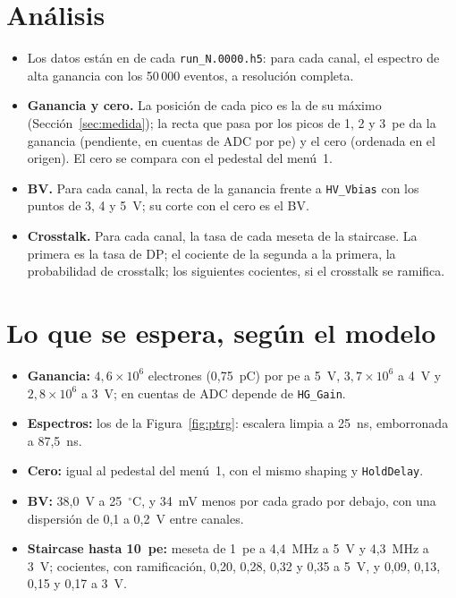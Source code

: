 \documentclass[11pt,a4paper]{article}
\begin{document}
\section{Análisis}
\label{sec:datos}

\begin{itemize}
\item {} Los datos están en
   de cada \texttt{run\_N.0000.h5}:
  para cada canal, el espectro de alta ganancia con los 50\,000 eventos, a
  resolución completa.
\item {\bf Ganancia y cero.} La posición de cada pico es la de su máximo
  (Sección~\ref{sec:medida}); la recta que pasa por los picos de 1, 2 y
  3~pe da la ganancia (pendiente, en cuentas de ADC por pe) y el cero
  (ordenada en el origen). El cero se compara con el pedestal del menú~1.
\item {\bf BV.} Para cada canal, la recta de la ganancia frente a
  \texttt{HV\_Vbias} con los puntos de 3, 4 y 5~V; su corte con el cero es
  el BV.
\item {\bf Crosstalk.} Para cada canal, la tasa de cada meseta de la
  staircase. La primera es la tasa de DP; el cociente de la segunda a la
  primera, la probabilidad de crosstalk; los siguientes cocientes, si el
  crosstalk se ramifica.
\end{itemize}

\section{Lo que se espera, según el modelo}

\begin{itemize}
\item {\bf Ganancia:} $4{,}6\times10^6$ electrones (0,75~pC) por pe a 5~V,
  $3{,}7\times10^6$ a 4~V y $2{,}8\times10^6$ a 3~V; en cuentas de ADC
  depende de \texttt{HG\_Gain}.
\item {\bf Espectros:} los de la Figura~\ref{fig:ptrg}: escalera limpia a
  25~ns, emborronada a 87,5~ns.
\item {\bf Cero:} igual al pedestal del menú~1, con el mismo shaping y
  \texttt{HoldDelay}.
\item {\bf BV:} 38,0~V a 25~$^\circ$C, y 34~mV menos por cada grado por
  debajo, con una dispersión de 0,1 a 0,2~V entre canales.
\item {\bf Staircase hasta 10~pe:} meseta de 1~pe a 4,4~MHz a 5~V y
  4,3~MHz a 3~V; cocientes, con ramificación, 0,20, 0,28, 0,32 y 0,35 a
  5~V, y 0,09, 0,13, 0,15 y 0,17 a 3~V.
\end{itemize}
\end{document}
